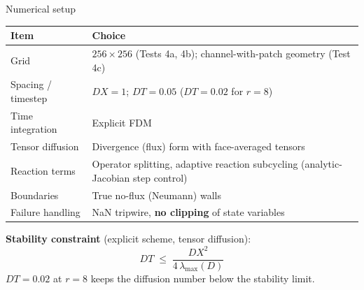 \documentclass[aspectratio=169,11pt]{beamer}
\begin{document}
\begin{frame}{Numerical setup}

\begin{table}
\centering
\small
\begin{tabular}{p{4.6cm}p{8.2cm}}
\toprule
\textbf{Item} & \textbf{Choice} \\
\midrule
Grid & $256 \times 256$ (Tests 4a, 4b); channel-with-patch geometry (Test 4c) \\
Spacing / timestep & $DX = 1$; $DT = 0.05$ ($DT = 0.02$ for $r = 8$) \\
Time integration & Explicit FDM \\
Tensor diffusion & Divergence (flux) form with face-averaged tensors \\
Reaction terms & Operator splitting, adaptive reaction subcycling (analytic-Jacobian step control) \\
Boundaries & True no-flux (Neumann) walls \\
Failure handling & NaN tripwire, \textbf{no clipping} of state variables \\
\bottomrule
\end{tabular}
\end{table}

\vspace{0.3cm}
\textbf{Stability constraint} (explicit scheme, tensor diffusion):
\[
    DT \;\le\; \frac{DX^2}{4\,\lambda_{\max}(D)}
\]
\centering
$DT = 0.02$ at $r = 8$ keeps the diffusion number below the stability limit.

\end{frame}
\end{document}
